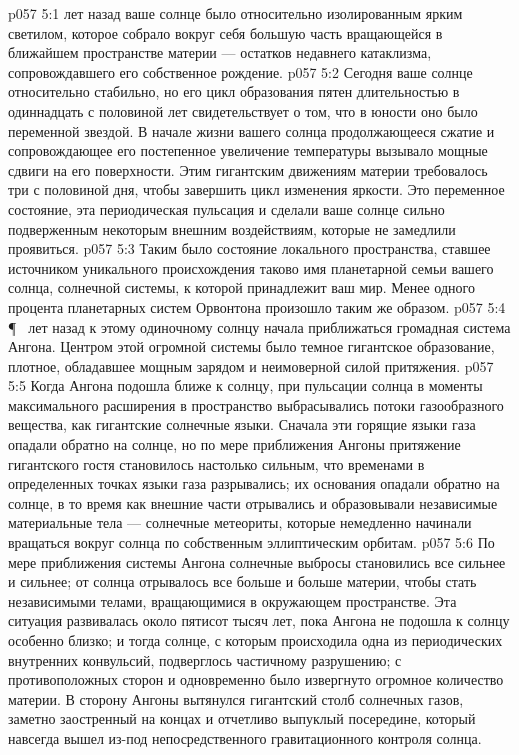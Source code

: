 \vs p057 5:1  лет назад ваше солнце было относительно изолированным ярким светилом, которое собрало вокруг себя большую часть вращающейся в ближайшем пространстве материи --- остатков недавнего катаклизма, сопровождавшего его собственное рождение.
\vs p057 5:2 Сегодня ваше солнце относительно стабильно, но его цикл образования пятен длительностью в одиннадцать с половиной лет свидетельствует о том, что в юности оно было переменной звездой. В начале жизни вашего солнца продолжающееся сжатие и сопровождающее его постепенное увеличение температуры вызывало мощные сдвиги на его поверхности. Этим гигантским движениям материи требовалось три с половиной дня, чтобы завершить цикл изменения яркости. Это переменное состояние, эта периодическая пульсация и сделали ваше солнце сильно подверженным некоторым внешним воздействиям, которые не замедлили проявиться.
\vs p057 5:3 Таким было состояние локального пространства, ставшее источником уникального происхождения  таково имя планетарной семьи вашего солнца, солнечной системы, к которой принадлежит ваш мир. Менее одного процента планетарных систем Орвонтона произошло таким же образом.
\vs p057 5:4 \P\  лет назад к этому одиночному солнцу начала приближаться громадная система Ангона. Центром этой огромной системы было темное гигантское образование, плотное, обладавшее мощным зарядом и неимоверной силой притяжения.
\vs p057 5:5 Когда Ангона подошла ближе к солнцу, при пульсации солнца в моменты максимального расширения в пространство выбрасывались потоки газообразного вещества, как гигантские солнечные языки. Сначала эти горящие языки газа опадали обратно на солнце, но по мере приближения Ангоны притяжение гигантского гостя становилось настолько сильным, что временами в определенных точках языки газа разрывались; их основания опадали обратно на солнце, в то время как внешние части отрывались и образовывали независимые материальные тела --- солнечные метеориты, которые немедленно начинали вращаться вокруг солнца по собственным эллиптическим орбитам.
\vs p057 5:6 По мере приближения системы Ангона солнечные выбросы становились все сильнее и сильнее; от солнца отрывалось все больше и больше материи, чтобы стать независимыми телами, вращающимися в окружающем пространстве. Эта ситуация развивалась около пятисот тысяч лет, пока Ангона не подошла к солнцу особенно близко; и тогда солнце, с которым происходила одна из периодических внутренних конвульсий, подверглось частичному разрушению; с противоположных сторон и одновременно было извергнуто огромное количество материи. В сторону Ангоны вытянулся гигантский столб солнечных газов, заметно заостренный на концах и отчетливо выпуклый посередине, который навсегда вышел из\hyp{}под непосредственного гравитационного контроля солнца.
